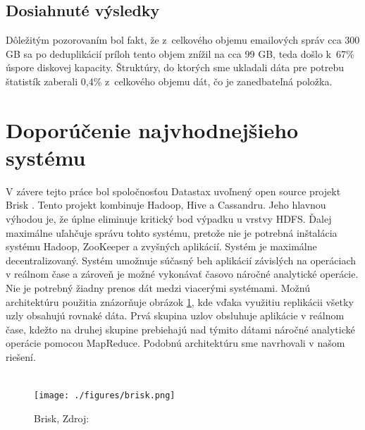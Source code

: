\documentclass[11pt,twoside,a4paper]{book}
\begin{document}
\subsection*{Dosiahnuté výsledky}
Dôležitým pozorovaním bol fakt, že z~celkového objemu emailových správ cca 300 GB sa po deduplikácií príloh tento objem znížil na cca 99 GB, teda došlo k~67\% úspore diskovej kapacity. Štruktúry, do ktorých sme ukladali dáta pre potrebu štatistík zaberali 0,4\% z~celkového objemu dát, čo je zanedbateľná položka.

\noindent

\section{Doporúčenie najvhodnejšieho systému}
V závere tejto práce bol spoločnosťou Datastax uvoľnený open source projekt Brisk \cite{brisk}. Tento projekt kombinuje Hadoop, Hive a Cassandru. Jeho hlavnou výhodou je, že úplne eliminuje kritický bod výpadku u vrstvy HDFS. Ďalej maximálne uľahčuje správu tohto systému, pretože nie je potrebná inštalácia systému Hadoop, ZooKeeper a zvyšných aplikácií. Systém je maximálne decentralizovaný. Systém umožnuje súčasný beh aplikácií závislých na operáciach v reálnom čase a zároveň je možné vykonávať časovo náročné analytické operácie. Nie je potrebný žiadny prenos dát medzi viacerými systémami. Možnú architektúru použitia znázorňuje obrázok \ref{fig:brisk}, kde vďaka využitiu replikácii všetky uzly obsahujú rovnaké dáta. Prvá skupina uzlov obsluhuje aplikácie v reálnom čase, kdežto na druhej skupine prebiehajú nad týmito dátami náročné analytické operácie pomocou MapReduce. Podobnú architektúru sme navrhovali v našom riešení. \\
\\

\begin{figure}[h]
 \centering
 \texttt{[image: ./figures/brisk.png]}
 \caption{Brisk, Zdroj: \cite{briskPic}}
 \label{fig:brisk}
\end{figure}


\end{document}

